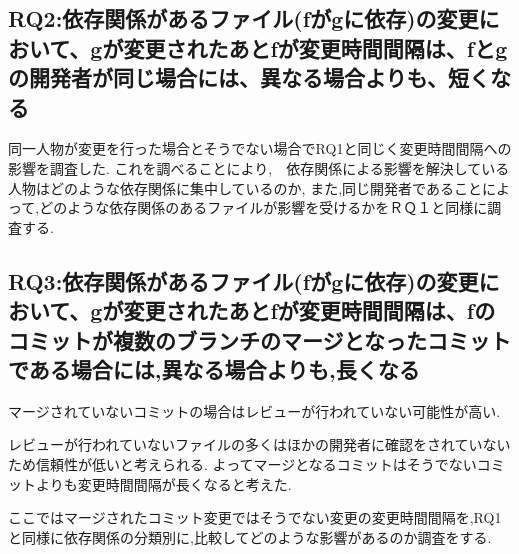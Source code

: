\documentclass{fose2016}           %
\begin{document}
\subsection{RQ2:依存関係があるファイル(fがgに依存)の変更において、gが変更されたあとfが変更時間間隔は、fとgの開発者が同じ場合には、異なる場合よりも、短くなる}
同一人物が変更を行った場合とそうでない場合でRQ1と同じく変更時間間隔への影響を調査した.
これを調べることにより,　依存関係による影響を解決している人物はどのような依存関係に集中しているのか,
また,同じ開発者であることによって,どのような依存関係のあるファイルが影響を受けるかをＲＱ１と同様に調査する.

\subsection{RQ3:依存関係があるファイル(fがgに依存)の変更において、gが変更されたあとfが変更時間間隔は、fのコミットが複数のブランチのマージとなったコミットである場合には,異なる場合よりも,長くなる}
マージされていないコミットの場合はレビューが行われていない可能性が高い.

レビューが行われていないファイルの多くはほかの開発者に確認をされていないため信頼性が低いと考えられる.
よってマージとなるコミットはそうでないコミットよりも変更時間間隔が長くなると考えた.

ここではマージされたコミット変更ではそうでない変更の変更時間間隔を,RQ1と同様に依存関係の分類別に,比較してどのような影響があるのか調査をする.

\end{document}
